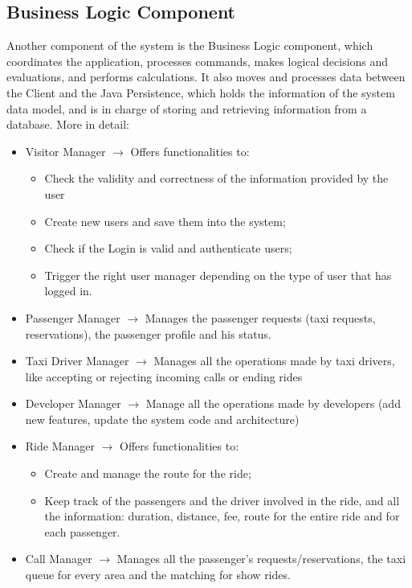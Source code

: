 \subsection{Business Logic Component}
Another component of the system is the Business Logic component, which coordinates the application, processes commands, makes logical decisions and evaluations, and performs calculations. It also moves and processes data between the Client and the Java Persistence, which holds the information of the system data model, and is in charge of storing and retrieving information from a database.
More in detail:
\begin{itemize}
	\item Visitor Manager $\rightarrow$ Offers functionalities to:
	\begin{itemize}
		\item Check the validity and correctness of the information provided by the user 
		\item Create new users and save them into the system;
		\item Check if the Login is valid and authenticate users;
		\item Trigger the right user manager depending on the type of user that has logged in.
	\end{itemize}
	\item Passenger Manager $\rightarrow$ Manages the passenger requests (taxi requests, reservations), the passenger profile and his status.
	\item Taxi Driver Manager $\rightarrow$ Manages all the operations made by taxi drivers, like accepting or rejecting incoming calls or ending rides
	\item Developer Manager $\rightarrow$ Manage all the operations made by developers (add new features, update the system code and architecture)
	\item Ride Manager $\rightarrow$ Offers functionalities to:
	\begin{itemize}
		\item Create and manage the route for the ride;
		\item Keep track of the passengers and the driver involved in the ride, and all the information: duration, distance, fee, route for the entire ride and for each passenger.
	\end{itemize}
	\item Call Manager $\rightarrow$ Manages all the passenger's requests/reservations, the taxi queue for every area and the matching for show rides.
\end{itemize}

